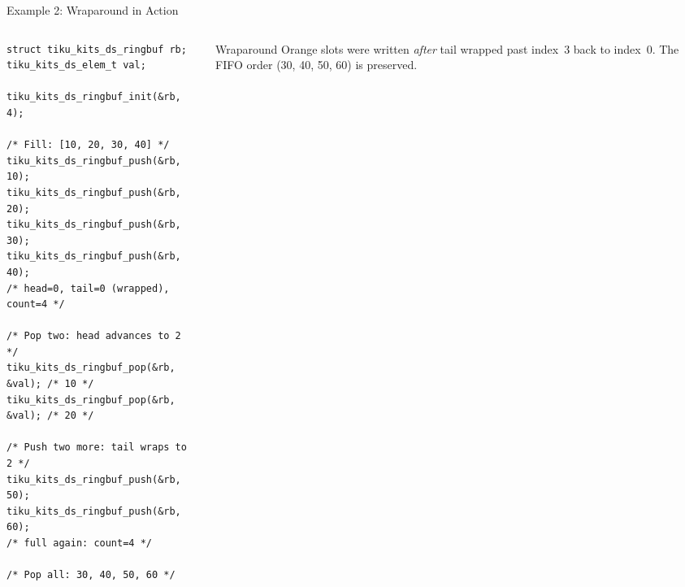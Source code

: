\documentclass[aspectratio=169, 10pt]{beamer}
\begin{document}
\begin{frame}[fragile]{Example 2: Wraparound in Action}
\begin{columns}[T]
\begin{column}{0.48\textwidth}
\begin{lstlisting}[style=cstyle,
  title={Fill, drain, refill --- tail wraps}]
struct tiku_kits_ds_ringbuf rb;
tiku_kits_ds_elem_t val;

tiku_kits_ds_ringbuf_init(&rb, 4);

/* Fill: [10, 20, 30, 40] */
tiku_kits_ds_ringbuf_push(&rb, 10);
tiku_kits_ds_ringbuf_push(&rb, 20);
tiku_kits_ds_ringbuf_push(&rb, 30);
tiku_kits_ds_ringbuf_push(&rb, 40);
/* head=0, tail=0 (wrapped), count=4 */

/* Pop two: head advances to 2 */
tiku_kits_ds_ringbuf_pop(&rb, &val); /* 10 */
tiku_kits_ds_ringbuf_pop(&rb, &val); /* 20 */

/* Push two more: tail wraps to 2 */
tiku_kits_ds_ringbuf_push(&rb, 50);
tiku_kits_ds_ringbuf_push(&rb, 60);
/* full again: count=4 */

/* Pop all: 30, 40, 50, 60 */
\end{lstlisting}
\end{column}

\begin{column}{0.48\textwidth}
\begin{center}
\end{center}

\vspace{0.3em}
\begin{block}{Wraparound}
Orange slots were written \emph{after} tail wrapped past index~3
back to index~0. The FIFO order (30, 40, 50, 60) is preserved.
\end{block}
\end{column}
\end{columns}
\end{frame}
\end{document}
